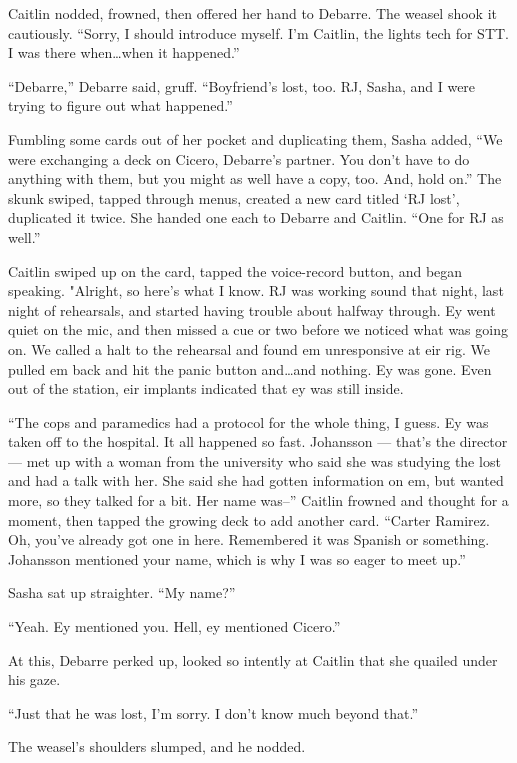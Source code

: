 Caitlin nodded, frowned, then offered her hand to Debarre. The weasel shook it cautiously. ``Sorry, I should introduce myself. I'm Caitlin, the lights tech for STT. I was there when\ldots{}when it happened.''

``Debarre,'' Debarre said, gruff. ``Boyfriend's lost, too. RJ, Sasha, and I were trying to figure out what happened.''

Fumbling some cards out of her pocket and duplicating them, Sasha added, ``We were exchanging a deck on Cicero, Debarre's partner. You don't have to do anything with them, but you might as well have a copy, too. And, hold on.'' The skunk swiped, tapped through menus, created a new card titled `RJ lost', duplicated it twice. She handed one each to Debarre and Caitlin. ``One for RJ as well.''

Caitlin swiped up on the card, tapped the voice-record button, and began speaking. "Alright, so here's what I know. RJ was working sound that night, last night of rehearsals, and started having trouble about halfway through. Ey went quiet on the mic, and then missed a cue or two before we noticed what was going on. We called a halt to the rehearsal and found em unresponsive at eir rig. We pulled em back and hit the panic button and\ldots{}and nothing. Ey was gone. Even out of the station, eir implants indicated that ey was still inside.

``The cops and paramedics had a protocol for the whole thing, I guess. Ey was taken off to the hospital. It all happened so fast. Johansson — that's the director — met up with a woman from the university who said she was studying the lost and had a talk with her. She said she had gotten information on em, but wanted more, so they talked for a bit. Her name was--'' Caitlin frowned and thought for a moment, then tapped the growing deck to add another card. ``Carter Ramirez. Oh, you've already got one in here. Remembered it was Spanish or something. Johansson mentioned your name, which is why I was so eager to meet up.''

Sasha sat up straighter. ``My name?''

``Yeah. Ey mentioned you. Hell, ey mentioned Cicero.''

At this, Debarre perked up, looked so intently at Caitlin that she quailed under his gaze.

``Just that he was lost, I'm sorry. I don't know much beyond that.''

The weasel's shoulders slumped, and he nodded.

